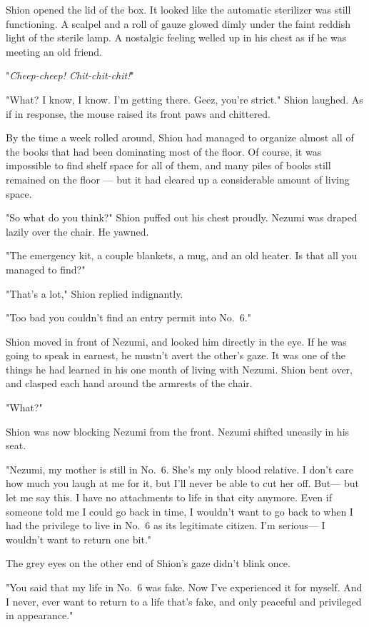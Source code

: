 Shion opened the lid of the box. It looked like the automatic sterilizer
was still functioning. A scalpel and a roll of gauze glowed dimly under
the faint reddish light of the sterile lamp. A nostalgic feeling welled
up in his chest as if he was meeting an old friend.

"\emph{Cheep-cheep! Chit-chit-chit!}"

"What? I know, I know. I'm getting there. Geez, you're strict." Shion
laughed. As if in response, the mouse raised its front paws and
chittered.

\mybreak

By the time a week rolled around, Shion had managed to organize almost
all of the books that had been dominating most of the floor. Of course,
it was impossible to find shelf space for all of them, and many piles of
books still remained on the floor --- but it had cleared up a considerable
amount of living space.

"So what do you think?" Shion puffed out his chest proudly. Nezumi was
draped lazily over the chair. He yawned.

"The emergency kit, a couple blankets, a mug, and an old heater. Is that
all you managed to find?"

"That's a lot," Shion replied indignantly.

"Too bad you couldn't find an entry permit into No.~6."

Shion moved in front of Nezumi, and looked him directly in the eye. If
he was going to speak in earnest, he mustn't avert the other's gaze. It
was one of the things he had learned in his one month of living with
Nezumi. Shion bent over, and clasped each hand around the armrests of
the chair.

"What?"

Shion was now blocking Nezumi from the front. Nezumi shifted uneasily in
his seat.

"Nezumi, my mother is still in No.~6. She's my only blood relative. I
don't care how much you laugh at me for it, but I'll never be able to
cut her off. But--- but let me say this. I have no attachments to life in
that city anymore. Even if someone told me I could go back in time, I
wouldn't want to go back to when I had the privilege to live in No.~6 as
its legitimate citizen. I'm serious--- I wouldn't want to return one bit."

The grey eyes on the other end of Shion's gaze didn't blink once.

"You said that my life in No.~6 was fake. Now I've experienced it for
myself. And I never, ever want to return to a life that's fake, and only
peaceful and privileged in appearance."

